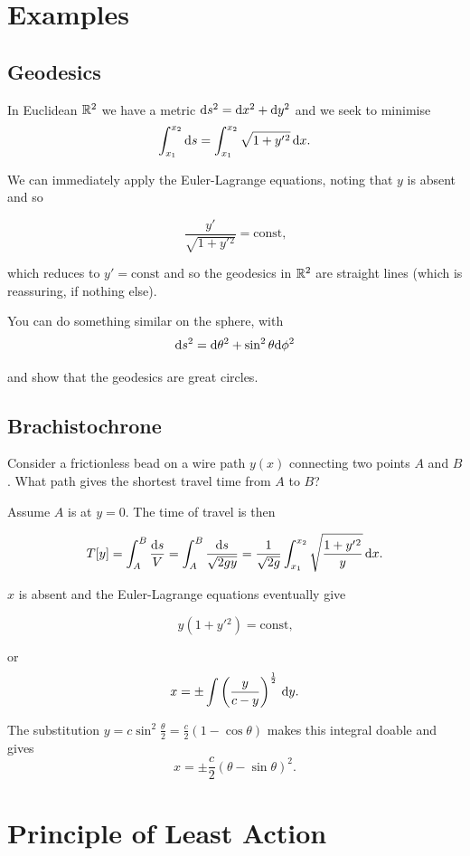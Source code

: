 \documentclass{notes}
\theoremstyle{plain}
\begin{document}
\section{Examples}

\subsection*{Geodesics}

In Euclidean $\mathbb{R}^2$ we have a metric $\mathrm{d} s^2 = \mathrm{d} x^2 + \mathrm{d} y^2$ and
we seek to minimise
\[
\int_{x_1}^{x_2} \mathrm{d} s = \int_{x_1}^{x_2} \sqrt{1 + y'{}^2}\, \mathrm{d} x.
\]

We can immediately apply the Euler-Lagrange equations, noting that $y$
is absent and so

\[
\frac{y'}{\sqrt{1 + y'{}^2}} = \text{const,}
\]

which reduces to $y' = \text{const}$ and so the geodesics in $\mathbb{R}^2$
are straight lines (which is reassuring, if nothing else).

You can do something similar on the sphere, with
\[
\mathrm{d} s^2 = \mathrm{d} \theta^2 + \sin^2 \theta \mathrm{d} \phi^2
\]

and show that the geodesics are great circles.

\subsection*{Brachistochrone}

Consider a frictionless bead on a wire path $y(x)$ connecting two points
$A$ and $B$.  What path gives the shortest travel time from $A$ to
$B$?

Assume $A$ is at $y=0$.  The time of travel is then

\[
T[y] = \int_A^B \frac{\mathrm{d} s}{V} = \int_A^B \frac{\mathrm{d} s}{\sqrt{2 g y}} 
= \frac{1}{\sqrt{2 g}} \int_{x_1}^{x_2} \sqrt{\frac{1 + y'{}^2}{y}}\, \mathrm{d} x.
\]

$x$ is absent and the Euler-Lagrange equations eventually give

\[
y (1 + y'{}^2) = \text{const,}
\]

or
\[
x = \pm \int \left(\frac{y}{c-y} \right)^{\frac{1}{2}} \, \mathrm{d} y.
\]

The substitution $y= c \sin^2 \frac{\theta}{2} = \frac{c}{2} ( 1- \cos
\theta)$ makes this integral doable and gives
\[
x = \pm \frac{c}{2} (\theta - \sin \theta)^2.
\]

\section{Principle of Least Action}
\end{document}
